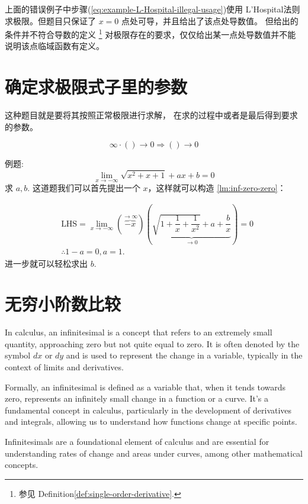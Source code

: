 上面的错误例子中步骤(\ref{eq:example-L-Hospital-illegal-usage})使用
L'Hospital法则求极限。但题目只保证了 $x = 0$ 点处可导，并且给出了该点处导数值。
但给出的条件并不符合导数的定义
\footnote{参见 Definition\ref{def:single-order-derivative}.}
对极限存在的要求，仅仅给出某一点处导数值并不能说明该点临域函数有定义。

\section{确定求极限式子里的参数}

这种题目就是要将其按照正常极限进行求解，
在求的过程中或者是最后得到要求的参数。

\begin{lemma} \label{lm:inf-zero-zero}
	\begin{equation}
		\infty \cdot () \to 0 \Rightarrow () \to 0
	\end{equation}

\end{lemma}

例题:
\[
\lim_{x \to -\infty} \sqrt{x^2+x+1} +  ax + b = 0
\]
求 $a, b.$
这道题我们可以首先提出一个 $x$，这样就可以构造 \ref{lm:inf-zero-zero}：

\begin{align*}
	&\mbox{LHS} = \lim_{x \to -\infty} \left(\overbrace{-x}^{ \to \infty }\right)
	\left( 
	\underbrace{\sqrt{1+\dfrac{1}{x}+\dfrac{1}{x^2}} + a + \dfrac{b}{x}}_{\to 0}
	\right) = 0\\
	&\therefore 1-a = 0, a = 1.
\end{align*}
进一步就可以轻松求出 $b$.

\section{无穷小阶数比较}

\begin{definition}
    In calculus, an infinitesimal is a concept that refers to an extremely small quantity, approaching zero but not quite equal to zero. It is often denoted by the symbol $dx$ or $dy$ and is used to represent the change in a variable, typically in the context of limits and derivatives.

    Formally, an infinitesimal is defined as a variable that, when it tends towards zero, represents an infinitely small change in a function or a curve. It's a fundamental concept in calculus, particularly in the development of derivatives and integrals, allowing us to understand how functions change at specific points.

    Infinitesimals are a foundational element of calculus and are essential for understanding rates of change and areas under curves, among other mathematical concepts.
\end{definition}

